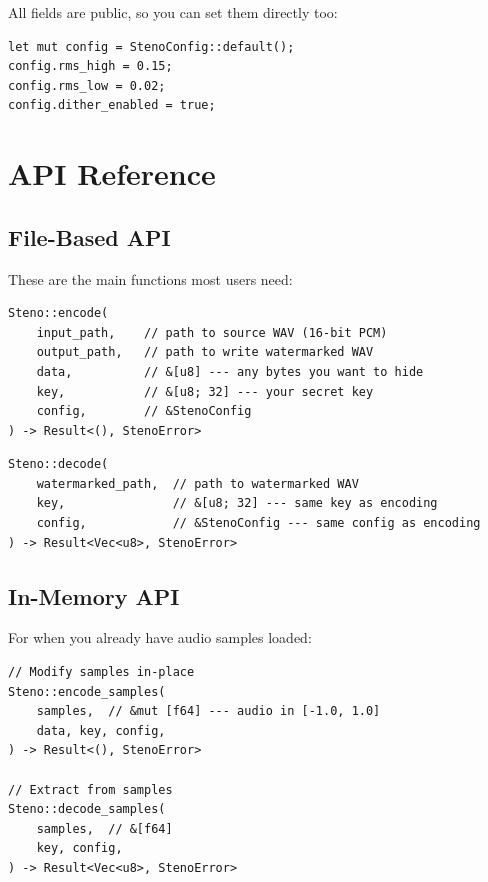 \documentclass[11pt,a4paper]{article}
\begin{document}
All fields are public, so you can set them directly too:

\begin{lstlisting}[style=rust]
let mut config = StenoConfig::default();
config.rms_high = 0.15;
config.rms_low = 0.02;
config.dither_enabled = true;
\end{lstlisting}


\section{API Reference}

\subsection{File-Based API}

These are the main functions most users need:

\begin{tcolorbox}[colback=gray!5, colframe=gray!60, title=\texttt{Steno::encode}]
\begin{lstlisting}[style=rust]
Steno::encode(
    input_path,    // path to source WAV (16-bit PCM)
    output_path,   // path to write watermarked WAV
    data,          // &[u8] --- any bytes you want to hide
    key,           // &[u8; 32] --- your secret key
    config,        // &StenoConfig
) -> Result<(), StenoError>
\end{lstlisting}
\end{tcolorbox}

\begin{tcolorbox}[colback=gray!5, colframe=gray!60, title=\texttt{Steno::decode}]
\begin{lstlisting}[style=rust]
Steno::decode(
    watermarked_path,  // path to watermarked WAV
    key,               // &[u8; 32] --- same key as encoding
    config,            // &StenoConfig --- same config as encoding
) -> Result<Vec<u8>, StenoError>
\end{lstlisting}
\end{tcolorbox}

\subsection{In-Memory API}

For when you already have audio samples loaded:

\begin{tcolorbox}[colback=gray!5, colframe=gray!60, title=\texttt{Steno::encode\_samples} / \texttt{decode\_samples}]
\begin{lstlisting}[style=rust]
// Modify samples in-place
Steno::encode_samples(
    samples,  // &mut [f64] --- audio in [-1.0, 1.0]
    data, key, config,
) -> Result<(), StenoError>

// Extract from samples
Steno::decode_samples(
    samples,  // &[f64]
    key, config,
) -> Result<Vec<u8>, StenoError>
\end{lstlisting}
\end{tcolorbox}
\end{document}
